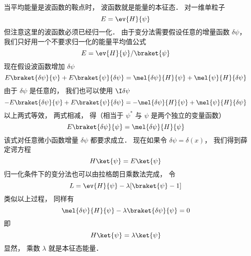 
当平均能量是波函数的鞍点时， 波函数就是能量的本征态． 对一维单粒子
\begin{equation}
E = \ev{H}{\psi}
\end{equation}
但注意这里的波函数必须已经归一化． 由于变分法需要假设任意的增量函数 $\delta \psi $，  我们只好用一个不要求归一化的能量平均值公式
\begin{equation}
E = \ev{H}{\psi} /\braket{\psi}
\end{equation}
现在假设波函数增加 $\delta \psi$ 
\begin{equation}
E \braket{\delta\psi}{\psi} + E\braket{\psi}{\delta\psi}
= \mel{\delta \psi}{H}{\psi} + \mel{\psi}{H}{\delta\psi}
\end{equation}
由于 $\delta\psi$ 是任意的， 我们也可以使用 $\I\delta\psi$ 
\begin{equation}
-E \braket{\delta\psi}{\psi} + E \braket{\psi}{\delta\psi}
= -\mel{\delta\psi}{H}{\psi} + \mel{\psi}{H}{\delta\psi}
\end{equation}
以上两式等效， 两式相减， 得（相当于 $\psi^*$ 与 $\psi$ 是两个独立的变量函数）
\begin{equation}
E\braket{\delta\psi}{\psi} = \mel{\delta\psi}{H}{\psi}
\end{equation}
该式对任意微小函数增量 $\delta\psi $ 都要求成立． 现在如果令 $\delta \psi  = \delta (x)$，  我们得到薛定谔方程
\begin{equation}
H \ket{\psi} = E\ket{\psi}
\end{equation}
归一化条件下的变分法也可以由拉格朗日乘数法完成， 令
\begin{equation}
L = \ev{H}{\psi} - \lambda [\braket{\psi} - 1]
\end{equation}
类似以上过程， 同样有
\begin{equation}
\mel{\delta\psi}{H}{\psi} - \lambda\braket{\delta\psi}{\psi} = 0
\end{equation}
即
\begin{equation}
H \ket{\psi} = \lambda \ket{\psi}
\end{equation}
显然， 乘数 $\lambda $ 就是本征态能量．
